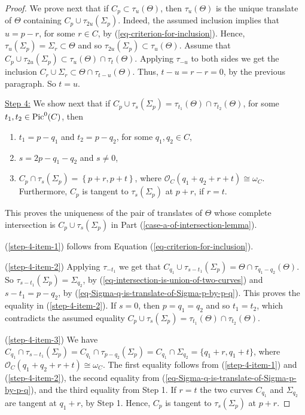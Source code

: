 \documentclass[12pt]{amsart}
\numberwithin{equation}{subsection}
\theoremstyle{plain}
\theoremstyle{definition}
\newcommand{\StructureSheaf}[1]{{\mathcal O}_{#1}}
\newcommand{\Pic}{{\rm Pic}}
\begin{document}
\begin{proof}
We prove next that if $C_p\subset \tau_u(\Theta)$, then $\tau_u(\Theta)$ is the unique translate of $\Theta$ containing $C_p\cup \tau_{2u}(\Sigma_p)$. Indeed, the assumed inclusion implies that $u=p-r$, for some $r\in C$, by (\ref{eq-criterion-for-inclusion}). 
Hence, $\tau_u(\Sigma_p)=\Sigma_r\subset\Theta$ and so $\tau_{2u}(\Sigma_p)\subset\tau_u(\Theta)$.
Assume that 
$
C_p\cup \tau_{2u}(\Sigma_p)\subset \tau_u(\Theta)\cap\tau_t(\Theta).
$
Applying $\tau_{-u}$ to both sides we get the inclusion
$
C_r\cup\Sigma_r\subset \Theta\cap \tau_{t-u}(\Theta).
$
Thus, $t-u=r-r=0$, by the previous paragraph. So $t=u$.

\underline{Step 4:} We show next that 
if $C_p\cup\tau_s(\Sigma_p)=\tau_{t_1}(\Theta)\cap\tau_{t_2}(\Theta)$, for some $t_1, t_2\in\Pic^0(C)$, then 
\begin{enumerate}
\item
\label{step-4-item-1}
$t_1=p-q_1$ and $t_2=p-q_2$, for some $q_1, q_2\in C$, 
\item
\label{step-4-item-2}
$s=2p-q_1-q_2$ and $s\neq 0$,
\item
\label{step-4-item-3}
$C_p\cap\tau_s(\Sigma_p)=\left\{p+r, p+t
\right\}$, where $\StructureSheaf{C}(q_1+q_2+r+t)\cong\omega_C$. Furthermore, $C_p$ is tangent to $\tau_s(\Sigma_p)$ at
$p+r$, if $r=t$.
\end{enumerate}
This proves the uniqueness of the pair of translates of $\Theta$ whose complete intersection is $C_p\cup\tau_s(\Sigma_p)$ in Part (\ref{case-a-of-intersection-lemma}).

(\ref{step-4-item-1}) follows from Equation (\ref{eq-criterion-for-inclusion}).

(\ref{step-4-item-2}) 
Applying $\tau_{-t_1}$ we get that 
$C_{q_1}\cup \tau_{s-t_1}(\Sigma_p)=\Theta\cap \tau_{q_1-q_2}(\Theta)$. So $\tau_{s-t_1}(\Sigma_p)=\Sigma_{q_2}$, 
by (\ref{eq-intersection-is-union-of-two-curves}) and $s-t_1=p-q_2$, by (\ref{eq-Sigma-q-is-translate-of-Sigma-p-by-p-q}). This proves the equality in (\ref{step-4-item-2}). If $s=0$, then $p=q_1=q_2$ and so $t_1=t_2$, which contradicts the assumed equality 
$C_p\cup\tau_s(\Sigma_p)=\tau_{t_1}(\Theta)\cap\tau_{t_2}(\Theta)$.

(\ref{step-4-item-3}) We have
$C_{q_1}\cap \tau_{s-t_1}(\Sigma_p)=C_{q_1}\cap \tau_{p-q_2}(\Sigma_p)=C_{q_1}\cap \Sigma_{q_2}=\{q_1+r, q_1+t\}$, 
where $\StructureSheaf{C}(q_1+q_2+r+t)\cong\omega_C$. The first equality follows from (\ref{step-4-item-1})  and (\ref{step-4-item-2}), the second equality from (\ref{eq-Sigma-q-is-translate-of-Sigma-p-by-p-q}), and the third equality from Step 1. If $r=t$ the two curves $C_{q_1}$ and $\Sigma_{q_2}$ are tangent at $q_1+r$, by Step 1. Hence, $C_p$ is tangent to $\tau_s(\Sigma_p)$ at $p+r$.


\end{proof}
\end{document}
